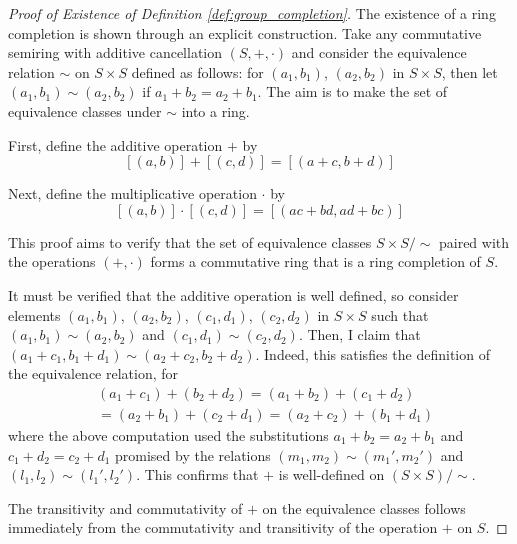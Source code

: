 \documentclass[../../sean_thesis.tex]{subfiles}
\begin{document}
\begin{proof}[Proof of Existence of Definition \ref{def:group_completion}]


The existence of a ring completion is shown through an explicit construction. Take any commutative semiring with additive cancellation $(S,+,\cdot)$ and consider the equivalence relation $\sim$ on $S \times S$ defined as follows: for $(a_1, b_1)$, $(a_2, b_2)$ in $S \times S$, then let $(a_1,b_1) \sim (a_2,b_2)$ if $a_1 + b_2 = a_2 + b_1$. The aim is to make the set of equivalence classes under $\sim$ into a ring.


First, define the additive operation $+$ by 
	$$[(a,b)] + [(c,d)] = [(a+c,b+d)]$$	
	

Next, define the multiplicative operation $\cdot$ by
	$$[(a,b)]\cdot[(c,d)] = [(ac+bd, ad+bc)]$$


This proof aims to verify that the set of equivalence classes $S \times S/\sim$ paired with the operations $(+, \cdot)$ forms a commutative ring that is a ring completion of $S$.
	
	
It must be verified that the additive operation is well defined, so consider elements $(a_1, b_1)$, $(a_2, b_2)$, $(c_1, d_1)$, $(c_2, d_2)$ in $S \times S$ such that $(a_1, b_1) \sim (a_2, b_2)$ and $(c_1, d_1) \sim (c_2, d_2)$. Then, I claim that $(a_1+c_1,b_1+d_1) \sim (a_2+c_2,b_2+d_2)$. Indeed, this satisfies the definition of the equivalence relation, for
	\begin{align*}
		& (a_1 + c_1) + (b_2 + d_2) = (a_1 + b_2) + (c_1 + d_2) \\
		& = (a_2 + b_1) + (c_2 + d_1) = (a_2 + c_2) + (b_1 + d_1)
	\end{align*}
where the above computation used the substitutions $a_1+b_2 = a_2+b_1$ and $c_1+d_2 = c_2+d_1$ promised by the relations $(m_1, m_2) \sim (m_1', m_2')$ and $(l_1, l_2) \sim (l_1', l_2')$. This confirms that $+$ is well-defined on $(S\times S)/\sim$.
	

The transitivity and commutativity of $+$ on the equivalence classes follows immediately from the commutativity and transitivity of the operation $+$ on $S$.
	

\end{proof}
\end{document}
